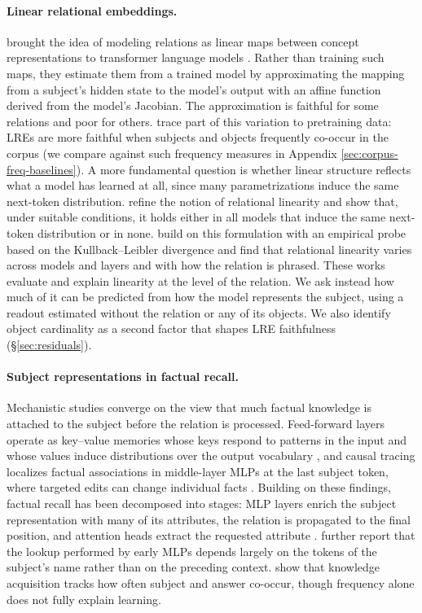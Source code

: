 \paragraph{Linear relational embeddings.}
\citet{hernandez2024linearity} brought the idea of
modeling relations as linear maps between concept representations
\citep{DBLP:conf/icml/PaccanaroH00} to transformer
language models \citep{vaswani2017attention}. Rather than
training such maps, they estimate them from a trained model by
approximating the mapping from a subject's hidden state to the model's
output with an affine function derived from the model's Jacobian. The
approximation is faithful for some relations and poor for others.
\citet{merullo2025linear} trace part of this
variation to pretraining data: LREs are more faithful when subjects and
objects frequently co-occur in the corpus (we compare against such
frequency measures in Appendix \ref{sec:corpus-freq-baselines}). A more fundamental question is
whether linear structure reflects what a model has learned at all, since
many parametrizations induce the same next-token distribution.
\citet{marconato2024all} refine the notion of
relational linearity and show that, under suitable conditions, it holds
either in all models that induce the same next-token distribution or in
none. \citet{valer2026relational} build on this
formulation with an empirical probe based on the Kullback--Leibler
divergence and find that relational linearity varies across models and
layers and with how the relation is phrased. These works evaluate and
explain linearity at the level of the relation. We ask instead how much
of it can be predicted from how the model represents the subject, using
a readout estimated without the relation or any of its objects. We also
identify object cardinality as a second factor that shapes LRE
faithfulness (§\ref{sec:residuals}).

\paragraph{Subject representations in factual recall.} Mechanistic studies
converge on the view that much factual knowledge is attached to the
subject before the relation is processed. Feed-forward layers operate as
key--value memories whose keys respond to patterns in the input and
whose values induce distributions over the output vocabulary
\citep{geva2022transformer}, and causal tracing
localizes factual associations in middle-layer MLPs at the last subject
token, where targeted edits can change individual facts
\citep{meng2022locating}. Building on these findings,
factual recall has been decomposed into stages: MLP layers enrich the
subject representation with many of its attributes, the relation is
propagated to the final position, and attention heads extract the
requested attribute
\citep{geva-etal-2023-dissecting, nanda2024fact}.
\citet{nanda2024fact} further report that the lookup
performed by early MLPs depends largely on the tokens of the subject's
name rather than on the preceding context.
\citet{10.1162/TACL.a.746} show that knowledge
acquisition tracks how often subject and answer co-occur, though
frequency alone does not fully explain learning.

